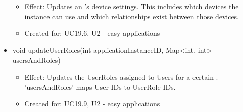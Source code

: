 \begin{description}
\begin{itemize}[noitemsep,nolistsep,leftmargin=-.25cm]
\begin{itemize}[noitemsep,nolistsep]
           \item Effect: Updates an 's device settings. This includes which devices the instance can use and which relationships exist between those devices.
\item Created for: UC19.6, U2 - easy applications
        \end{itemize}
      \item \textsf{void updateUserRoles(int applicationInstanceID, Map\textless{}int, int\textgreater{} usersAndRoles)}
        \begin{itemize}[noitemsep,nolistsep]
           \item Effect: Updates the UserRoles assigned to Users for a certain . 'usersAndRoles' maps User IDs to UserRole IDs.
\item Created for: UC19.9, U2 - easy applications
        \end{itemize}
    \end{itemize}
    \end{description}

